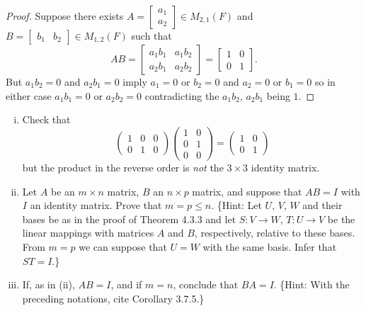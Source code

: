 \begin{proof}
    Suppose there exists
    $A = \begin{bmatrix} a_1 \\ a_2 \end{bmatrix} \in M_{2,1}(F)$
    and
    $B = \begin{bmatrix} b_1 & b_2 \end{bmatrix} \in M_{1,2}(F)$
    such that
    \[
    AB = \begin{bmatrix} a_1 b_1 & a_1 b_2 \\ a_2 b_1 & a_2 b_2 \end{bmatrix} = \begin{bmatrix} 1 & 0 \\ 0 & 1 \end{bmatrix}.
    \]
    But $a_1 b_2 = 0$ and $a_2 b_1 = 0$ imply $a_1 = 0$ or $b_2 = 0$ and $a_2 = 0$ or 
    $b_1 = 0$ so in either case $a_1 b_1 = 0$ or $a_2 b_2 = 0$ contradicting the 
    $a_1 b_2$, $a_2 b_1$ being $1$.
\end{proof}

\begin{tcolorbox}[title=Exercise 2, breakable]
    \begin{enumerate}[(i)]
        \item Check that
        \[
        \begin{pmatrix} 1 & 0 & 0 \\ 0 & 1 & 0 \end{pmatrix}
        \begin{pmatrix} 1 & 0 \\ 0 & 1 \\ 0 & 0 \end{pmatrix}
        =
        \begin{pmatrix} 1 & 0 \\ 0 & 1 \end{pmatrix}
        \]
        but the product in the reverse order is \textit{not} the $3 \times 3$ identity matrix.

        \item Let $A$ be an $m \times n$ matrix, $B$ an $n \times p$ matrix, and suppose
        that $AB = I$ with $I$ an identity matrix. Prove that $m = p \leq n$.
        \{Hint: Let $U$, $V$, $W$ and their bases be as in the proof of Theorem 4.3.3
        and let $S: V \to W$, $T: U \to V$ be the linear mappings with matrices $A$ and
        $B$, respectively, relative to these bases. From $m = p$ we can suppose that
        $U = W$ with the same basis. Infer that $ST = I$.\}

        \item If, as in (ii), $AB = I$, and if $m = n$, conclude that $BA = I$.
        \{Hint: With the preceding notations, cite Corollary 3.7.5.\}
    \end{enumerate}
\end{tcolorbox}

